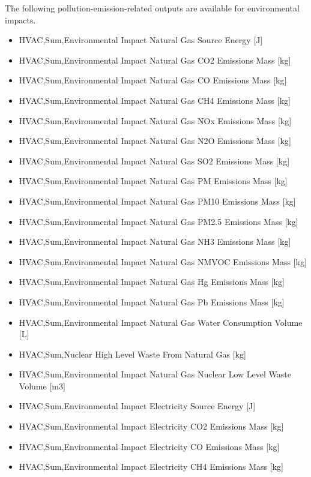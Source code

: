 The following pollution-emission-related outputs are available for environmental impacts.

\begin{itemize}
\item
  HVAC,Sum,Environmental Impact Natural Gas Source Energy {[}J{]}
\item
  HVAC,Sum,Environmental Impact Natural Gas CO2 Emissions Mass {[}kg{]}
\item
  HVAC,Sum,Environmental Impact Natural Gas CO Emissions Mass {[}kg{]}
\item
  HVAC,Sum,Environmental Impact Natural Gas CH4 Emissions Mass {[}kg{]}
\item
  HVAC,Sum,Environmental Impact Natural Gas NOx Emissions Mass {[}kg{]}
\item
  HVAC,Sum,Environmental Impact Natural Gas N2O Emissions Mass {[}kg{]}
\item
  HVAC,Sum,Environmental Impact Natural Gas SO2 Emissions Mass {[}kg{]}
\item
  HVAC,Sum,Environmental Impact Natural Gas PM Emissions Mass {[}kg{]}
\item
  HVAC,Sum,Environmental Impact Natural Gas PM10 Emissions Mass {[}kg{]}
\item
  HVAC,Sum,Environmental Impact Natural Gas PM2.5 Emissions Mass {[}kg{]}
\item
  HVAC,Sum,Environmental Impact Natural Gas NH3 Emissions Mass {[}kg{]}
\item
  HVAC,Sum,Environmental Impact Natural Gas NMVOC Emissions Mass {[}kg{]}
\item
  HVAC,Sum,Environmental Impact Natural Gas Hg Emissions Mass {[}kg{]}
\item
  HVAC,Sum,Environmental Impact Natural Gas Pb Emissions Mass {[}kg{]}
\item
  HVAC,Sum,Environmental Impact Natural Gas Water Consumption Volume {[}L{]}
\item
  HVAC,Sum,Nuclear High Level Waste From Natural Gas {[}kg{]}
\item
  HVAC,Sum,Environmental Impact Natural Gas Nuclear Low Level Waste Volume {[}m3{]}
\item
  HVAC,Sum,Environmental Impact Electricity Source Energy {[}J{]}
\item
  HVAC,Sum,Environmental Impact Electricity CO2 Emissions Mass {[}kg{]}
\item
  HVAC,Sum,Environmental Impact Electricity CO Emissions Mass {[}kg{]}
\item
  HVAC,Sum,Environmental Impact Electricity CH4 Emissions Mass {[}kg{]}

\end{itemize}
